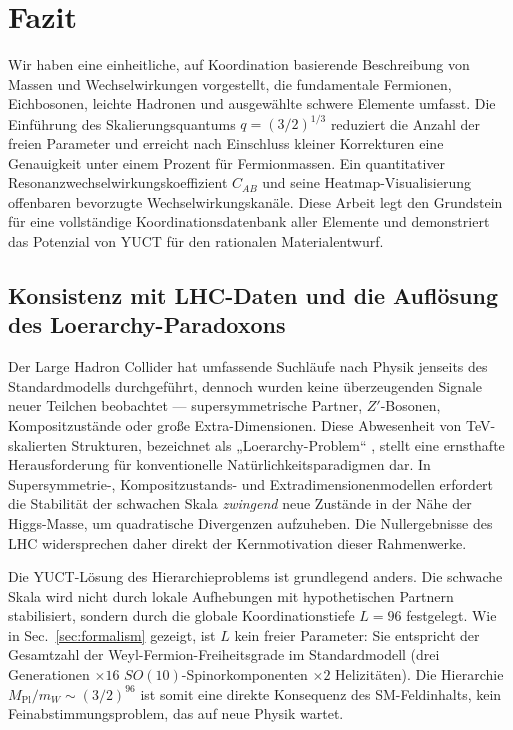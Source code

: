 \documentclass[11pt,a4paper]{article}
\begin{document}
	\section{Fazit}
	\label{sec:conclusion}
	
	Wir haben eine einheitliche, auf Koordination basierende Beschreibung von Massen und Wechselwirkungen vorgestellt, die fundamentale Fermionen, Eichbosonen, leichte Hadronen und ausgewählte schwere Elemente umfasst. Die Einführung des Skalierungsquantums \(q = (3/2)^{1/3}\) reduziert die Anzahl der freien Parameter und erreicht nach Einschluss kleiner Korrekturen eine Genauigkeit unter einem Prozent für Fermionmassen. Ein quantitativer Resonanzwechselwirkungskoeffizient \(C_{AB}\) und seine Heatmap-Visualisierung offenbaren bevorzugte Wechselwirkungskanäle. Diese Arbeit legt den Grundstein für eine vollständige Koordinationsdatenbank aller Elemente und demonstriert das Potenzial von YUCT für den rationalen Materialentwurf.
	
	\subsection{Konsistenz mit LHC-Daten und die Auflösung des Loerarchy-Paradoxons}
	
	Der Large Hadron Collider hat umfassende Suchläufe nach Physik jenseits des Standardmodells durchgeführt, dennoch wurden keine überzeugenden Signale neuer Teilchen beobachtet — supersymmetrische Partner, $Z'$-Bosonen, Kompositzustände oder große Extra-Dimensionen. Diese Abwesenheit von TeV-skalierten Strukturen, bezeichnet als „Loerarchy-Problem“ \cite{Koren2020}, stellt eine ernsthafte Herausforderung für konventionelle Natürlichkeitsparadigmen dar. In Supersymmetrie-, Kompositzustands- und Extradimensionenmodellen erfordert die Stabilität der schwachen Skala \emph{zwingend} neue Zustände in der Nähe der Higgs-Masse, um quadratische Divergenzen aufzuheben. Die Nullergebnisse des LHC widersprechen daher direkt der Kernmotivation dieser Rahmenwerke.
	
	Die YUCT-Lösung des Hierarchieproblems ist grundlegend anders. Die schwache Skala wird nicht durch lokale Aufhebungen mit hypothetischen Partnern stabilisiert, sondern durch die globale Koordinationstiefe $L=96$ festgelegt. Wie in Sec.~\ref{sec:formalism} gezeigt, ist $L$ kein freier Parameter: Sie entspricht der Gesamtzahl der Weyl-Fermion-Freiheitsgrade im Standardmodell (drei Generationen $\times 16$ $SO(10)$-Spinorkomponenten $\times 2$ Helizitäten). Die Hierarchie $M_{\mathrm{Pl}}/m_W \sim (3/2)^{96}$ ist somit eine direkte Konsequenz des SM-Feldinhalts, kein Feinabstimmungsproblem, das auf neue Physik wartet.
	
\end{document}
